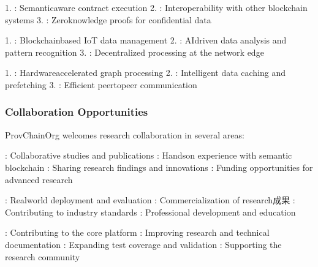 \documentclass[letterpaper,10pt,english]{sphinxmanual}
\begin{document}
\sphinxAtStartPar
{}
1. : Semantic\sphinxhyphen{}aware contract execution
2. : Interoperability with other blockchain systems
3. : Zero\sphinxhyphen{}knowledge proofs for confidential data

\sphinxAtStartPar
{}
1. : Blockchain\sphinxhyphen{}based IoT data management
2. : AI\sphinxhyphen{}driven data analysis and pattern recognition
3. : Decentralized processing at the network edge

\sphinxAtStartPar
{}
1. : Hardware\sphinxhyphen{}accelerated graph processing
2. : Intelligent data caching and prefetching
3. : Efficient peer\sphinxhyphen{}to\sphinxhyphen{}peer communication


\subsubsection{Collaboration Opportunities}
\label{\detokenize{research/index:collaboration-opportunities}}
\sphinxAtStartPar
ProvChainOrg welcomes research collaboration in several areas:

\sphinxAtStartPar
{}
\sphinxhyphen{} : Collaborative studies and publications
\sphinxhyphen{} : Hands\sphinxhyphen{}on experience with semantic blockchain
\sphinxhyphen{} : Sharing research findings and innovations
\sphinxhyphen{} : Funding opportunities for advanced research

\sphinxAtStartPar
{}
\sphinxhyphen{} : Real\sphinxhyphen{}world deployment and evaluation
\sphinxhyphen{} : Commercialization of research成果
\sphinxhyphen{} : Contributing to industry standards
\sphinxhyphen{} : Professional development and education

\sphinxAtStartPar
{}
\sphinxhyphen{} : Contributing to the core platform
\sphinxhyphen{} : Improving research and technical documentation
\sphinxhyphen{} : Expanding test coverage and validation
\sphinxhyphen{} : Supporting the research community
\end{document}
